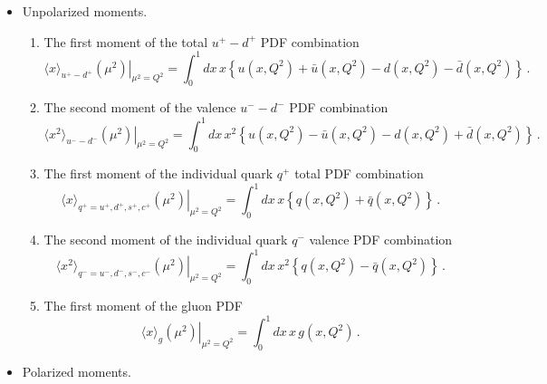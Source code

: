 \begin{itemize}

\item Unpolarized moments.

\begin{enumerate}

\item The first moment of the total $u^+-d^+$ PDF combination
\begin{equation}
\left.\langle x\rangle_{u^+-d^+}(\mu^2)\right|_{\mu^2=Q^2}
=
\int_0^1 dx\, x\left\{u(x,Q^2)+\bar{u}(x,Q^2)-d(x,Q^2)-\bar{d}(x,Q^2)\right\} \, .
\label{eq:unpfmumdtot}
\end{equation}

\item The second moment of the valence $u^--d^-$ PDF combination
\begin{equation}
\left.\langle x^2\rangle_{u^--d^-}(\mu^2)\right|_{\mu^2=Q^2}
=
\int_0^1 dx\, x^2\left\{u(x,Q^2)-\bar{u}(x,Q^2)-d(x,Q^2)+\bar{d}(x,Q^2)\right\} \, .
\label{eq:unpsmumdval}  
\end{equation}

\item The first moment of the individual quark $q^+$ total PDF combination
\begin{equation}
\left.\langle x\rangle_{q^+=u^+,d^+,s^+,c^+}(\mu^2)\right|_{\mu^2=Q^2}
=
\int_0^1 dx\, x\left\{q(x,Q^2)+\bar{q}(x,Q^2)\right\} \, .
\label{eq:unpfmiqtot}
\end{equation}

\item The second moment of the individual quark $q^-$ valence PDF combination
\begin{equation}
\left.\langle x^2\rangle_{q^-=u^-,d^-,s^-,c^-}(\mu^2)\right|_{\mu^2=Q^2}
=
\int_0^1 dx\, x^2\left\{q(x,Q^2)-\bar{q}(x,Q^2)\right\} \, .
\label{eq:unpsmiqval}
\end{equation}

\item The first moment of the gluon PDF
\begin{equation}
\left.\langle x \rangle_g(\mu^2)\right|_{\mu^2=Q^2}
=
\int_0^1 dx\, x\, g(x,Q^2) \, .
\label{eq:unpfmg}
\end{equation}

\end{enumerate}

\item Polarized moments.

\begin{enumerate}


\end{enumerate}
\end{itemize}
